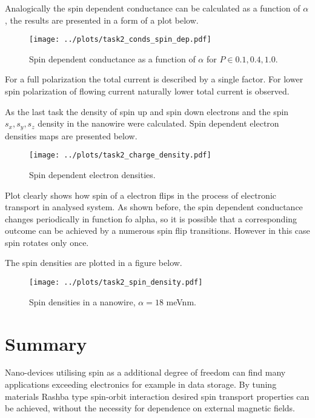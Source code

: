 \documentclass[12pt,a4]{article}
\begin{document}
Analogically the spin dependent conductance can be calculated as a function of $\alpha$, the results are presented in a form of a plot below.


\begin{figure}[H]
	\centering
	\texttt{[image: ../plots/task2\_conds\_spin\_dep.pdf]}
	\caption{Spin dependent conductance as a function of $\alpha$ for $P\in{0.1, 0.4, 1.0}$.}
\end{figure}

For a full polarization the total current is described by a single factor. For lower spin polarization of flowing current naturally lower total current is observed.

As the last task the density of spin up and spin down electrons and the spin $s_x, s_y,s_z$ density in the nanowire were calculated. Spin dependent electron densities maps are presented below.

\begin{figure}[H]
	\centering
	\texttt{[image: ../plots/task2\_charge\_density.pdf]}
	\caption{Spin dependent electron densities.}
\end{figure}

Plot clearly shows how spin of a electron flips in the process of electronic transport in analysed system. As shown before, the spin dependent conductance changes periodically in function fo alpha, so it is possible that a corresponding outcome can be achieved by a numerous spin flip transitions. However in this case spin rotates only once.

The spin densities are plotted in a figure below.
\begin{figure}[H]
	\centering
	\texttt{[image: ../plots/task2\_spin\_density.pdf]}
	\caption{Spin densities in a nanowire, $\alpha=18$ meVnm.}
\end{figure}

\section*{Summary}

Nano-devices utilising spin as a additional degree of freedom can find many applications exceeding electronics for example in data storage. By tuning materials Rashba type spin-orbit interaction desired spin transport properties can be achieved, without the necessity for dependence on external magnetic fields. 



 
\end{document}
